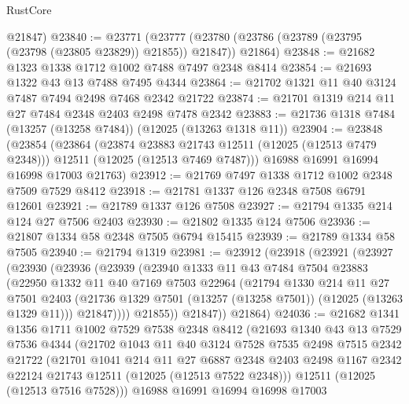 \begin{lexlean}{RustCore}
\begin{coremodule}
      @21847)
@23840 := @23771
    (@23777 (@23780 (@23786 (@23789 (@23795 (@23798 (@23805 @23829)) @21855)) @21847)) @21864)
@23848 := @21682 @1323 @1338 @1712 @1002 @7488 @7497 @2348 @8414
@23854 := @21693 @1322 @43 @13 @7488 @7495 @4344
@23864 := @21702 @1321 @11 @40 @3124 @7487 @7494 @2498 @7468 @2342 @21722
@23874 := @21701 @1319 @214 @11 @27 @7484 @2348 @2403 @2498 @7478 @2342
@23883 := @21736 @1318 @7484 (@13257 (@13258 @7484)) (@12025 (@13263 @1318 @11))
@23904 := @23848
    (@23854
      (@23864
        (@23874 @23883 @21743 @12511 (@12025 (@12513 @7479 @2348)))
        @12511
        (@12025 (@12513 @7469 @7487)))
      @16988
      @16991
      @16994
      @16998
      @17003
      @21763)
@23912 := @21769 @7497 @1338 @1712 @1002 @2348 @7509 @7529 @8412
@23918 := @21781 @1337 @126 @2348 @7508 @6791 @12601
@23921 := @21789 @1337 @126 @7508
@23927 := @21794 @1335 @214 @124 @27 @7506 @2403
@23930 := @21802 @1335 @124 @7506
@23936 := @21807 @1334 @58 @2348 @7505 @6794 @15415
@23939 := @21789 @1334 @58 @7505
@23940 := @21794 @1319
@23981 := @23912
    (@23918
      (@23921
        (@23927
          (@23930
            (@23936
              (@23939
                (@23940
                  @1333
                  @11
                  @43
                  @7484
                  @7504
                  @23883
                  (@22950
                    @1332
                    @11
                    @40
                    @7169
                    @7503
                    @22964
                    (@21794
                      @1330
                      @214
                      @11
                      @27
                      @7501
                      @2403
                      (@21736 @1329 @7501 (@13257 (@13258 @7501)) (@12025 (@13263 @1329 @11)))
                      @21847))))
              @21855))
          @21847))
      @21864)
@24036 := @21682
    @1341
    @1356
    @1711
    @1002
    @7529
    @7538
    @2348
    @8412
    (@21693
      @1340
      @43
      @13
      @7529
      @7536
      @4344
      (@21702
        @1043
        @11
        @40
        @3124
        @7528
        @7535
        @2498
        @7515
        @2342
        @21722
        (@21701
          @1041
          @214
          @11
          @27
          @6887
          @2348
          @2403
          @2498
          @1167
          @2342
          @22124
          @21743
          @12511
          (@12025 (@12513 @7522 @2348)))
        @12511
        (@12025 (@12513 @7516 @7528)))
      @16988
      @16991
      @16994
      @16998
      @17003

\end{coremodule}
\end{lexlean}

